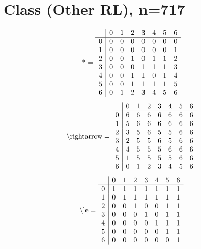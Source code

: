 \documentclass[11pt]{article}
\begin{document}
\section{Class (Other RL), n=717}
\[\text{*} = 
\begin{array}{r | r r r r r r r}
 & 0 & 1 & 2 & 3 & 4 & 5 & 6 \\ \hline
0 & 0 & 0 & 0 & 0 & 0 & 0 & 0 \\
1 & 0 & 0 & 0 & 0 & 0 & 0 & 1 \\
2 & 0 & 0 & 1 & 0 & 1 & 1 & 2 \\
3 & 0 & 0 & 0 & 1 & 1 & 1 & 3 \\
4 & 0 & 0 & 1 & 1 & 0 & 1 & 4 \\
5 & 0 & 0 & 1 & 1 & 1 & 1 & 5 \\
6 & 0 & 1 & 2 & 3 & 4 & 5 & 6 \\
\end{array}
\]
\[\text{\textbackslash rightarrow} = 
\begin{array}{r | r r r r r r r}
 & 0 & 1 & 2 & 3 & 4 & 5 & 6 \\ \hline
0 & 6 & 6 & 6 & 6 & 6 & 6 & 6 \\
1 & 5 & 6 & 6 & 6 & 6 & 6 & 6 \\
2 & 3 & 5 & 6 & 5 & 5 & 6 & 6 \\
3 & 2 & 5 & 5 & 6 & 5 & 6 & 6 \\
4 & 4 & 5 & 5 & 5 & 6 & 6 & 6 \\
5 & 1 & 5 & 5 & 5 & 5 & 6 & 6 \\
6 & 0 & 1 & 2 & 3 & 4 & 5 & 6 \\
\end{array}
\]
\[\text{\textbackslash le} = 
\begin{array}{r | r r r r r r r}
 & 0 & 1 & 2 & 3 & 4 & 5 & 6 \\ \hline
0 & 1 & 1 & 1 & 1 & 1 & 1 & 1 \\
1 & 0 & 1 & 1 & 1 & 1 & 1 & 1 \\
2 & 0 & 0 & 1 & 0 & 0 & 1 & 1 \\
3 & 0 & 0 & 0 & 1 & 0 & 1 & 1 \\
4 & 0 & 0 & 0 & 0 & 1 & 1 & 1 \\
5 & 0 & 0 & 0 & 0 & 0 & 1 & 1 \\
6 & 0 & 0 & 0 & 0 & 0 & 0 & 1 \\
\end{array}
\]
\end{document}
